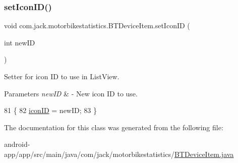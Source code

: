 \subsubsection{\texorpdfstring{set\+Icon\+I\+D()}{setIconID()}}
{\footnotesize\ttfamily void com.\+jack.\+motorbikestatistics.\+B\+T\+Device\+Item.\+set\+Icon\+ID (\begin{DoxyParamCaption}\item[{int}]{new\+ID }\end{DoxyParamCaption})\hspace{0.3cm}{\ttfamily [inline]}}



Setter for icon ID to use in List\+View. 


\begin{DoxyParams}{Parameters}
{\em new\+ID} & -\/ New icon ID to use. \\
\hline
\end{DoxyParams}

\begin{DoxyCode}
81                                      \{
82         \hyperlink{classcom_1_1jack_1_1motorbikestatistics_1_1_b_t_device_item_a77f7a3c228f87fa5e946fe77b310f805}{iconID} = newID;
83     \}
\end{DoxyCode}


The documentation for this class was generated from the following file\+:\begin{DoxyCompactItemize}
\item 
android-\/app/app/src/main/java/com/jack/motorbikestatistics/\hyperlink{_b_t_device_item_8java}{B\+T\+Device\+Item.\+java}\end{DoxyCompactItemize}
